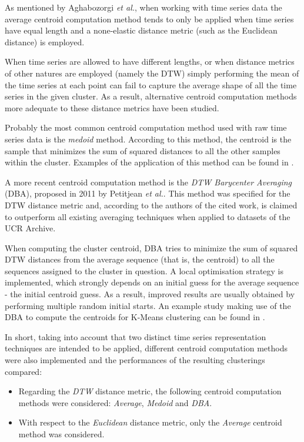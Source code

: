 \documentclass[9pt,journal,compsoc]{IEEEtran}
\begin{document}
As mentioned by Aghabozorgi \emph{et al.}\cite{aghabozorgi2015time}, when working with time series data the average centroid computation method tends to only be applied when time series have equal length and a none-elastic distance metric (such as the Euclidean distance) is employed.

When time series are allowed to have different lengths, or when distance metrics of other natures are employed (namely the DTW) simply performing the mean of the time series at each point can fail to capture the average shape of all the time series in the given cluster. As a result, alternative centroid computation methods more adequate to these distance metrics have been studied.

Probably the most common centroid computation method used with raw time series data is the \emph{medoid} method. According to this method, the centroid is the sample that minimizes the sum of squared distances to all the other samples within the cluster. Examples of the application of this method can be found in \cite{liao2006adaptive, izakian2015fuzzy}.

A more recent centroid computation method is the \emph{DTW Barycenter Averaging} (DBA)\cite{petitjean2011global}, proposed in 2011 by Petitjean \emph{et al.}. This method was specified for the DTW distance metric and, according to the authors of the cited work, is claimed to outperform all existing averaging techniques when applied to datasets of the UCR Archive\cite{keogh2006ucr}.

When computing the cluster centroid, DBA tries to minimize the sum of squared DTW distances from the average sequence (that is, the centroid) to all the sequences assigned to the cluster in question. A local optimisation strategy is implemented, which strongly depends on an initial guess for the average sequence - the initial centroid guess. As a result, improved results are usually obtained by performing multiple random initial starts. An example study making use of the DBA to compute the centroids for K-Means clustering can be found in \cite{petitjean2014dynamic}.

In short, taking into account that two distinct time series representation techniques are intended to be applied, different centroid computation methods were also implemented and the performances of the resulting clusterings compared:

\begin{itemize}
	\item Regarding the \emph{DTW} distance metric, the following centroid computation methods were considered: \emph{Average}, \emph{Medoid} and \emph{DBA}.
	
	\item With respect to the \emph{Euclidean} distance metric, only the \emph{Average} centroid method was considered.
\end{itemize}
\end{document}
